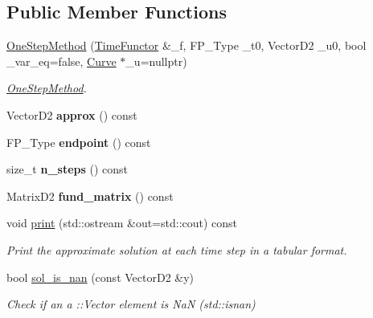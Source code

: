 \subsection*{Public Member Functions}
\begin{DoxyCompactItemize}
\item 
\hyperlink{classOneStepMethod_a513ea3b2bd015bd266f9cb3e69e00327}{One\+Step\+Method} (\hyperlink{classTimeFunctor}{Time\+Functor} \&\+\_\+f, F\+P\+\_\+\+Type \+\_\+t0, Vector\+D2 \+\_\+u0, bool \+\_\+var\+\_\+eq=false, \hyperlink{classCurve}{Curve} $\ast$\+\_\+u=nullptr)
\begin{DoxyCompactList}\small\item\em \hyperlink{classOneStepMethod}{One\+Step\+Method}. \end{DoxyCompactList}\item 
\mbox{\label{classOneStepMethod_a5f4529edf5aae96d1dd0061b7a798e4f}} 
Vector\+D2 {\bfseries approx} () const
\item 
\mbox{\label{classOneStepMethod_a5fa1efcb274907b97f31cfbbb0c5dc07}} 
F\+P\+\_\+\+Type {\bfseries endpoint} () const
\item 
\mbox{\label{classOneStepMethod_a7ae5bcaf0c1e48551456a6f0835414d2}} 
size\+\_\+t {\bfseries n\+\_\+steps} () const
\item 
\mbox{\label{classOneStepMethod_ad59a0fce9906ba9159da74aea44b3431}} 
Matrix\+D2 {\bfseries fund\+\_\+matrix} () const
\item 
void \hyperlink{classOneStepMethod_aa3fc1d095086c736ef23c60e56034474}{print} (std\+::ostream \&out=std\+::cout) const
\begin{DoxyCompactList}\small\item\em Print the approximate solution at each time step in a tabular format. \end{DoxyCompactList}\item 
\mbox{\label{classOneStepMethod_ad5e6154e9cc700056474c1c6128e3e9f}} 
bool \hyperlink{classOneStepMethod_ad5e6154e9cc700056474c1c6128e3e9f}{sol\+\_\+is\+\_\+nan} (const Vector\+D2 \&y)
\begin{DoxyCompactList}\small\item\em Check if an a \+::\+Vector element is NaN ({\ttfamily std\+::isnan}) \end{DoxyCompactList}\item 

\end{DoxyCompactItemize}
